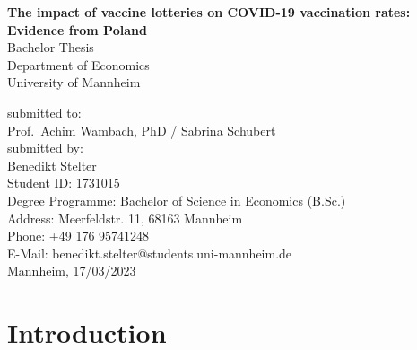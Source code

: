 \documentclass{scrbook}
\begin{document}
	
\frontmatter
\begin{titlepage}

\begin{center}

\vspace*{1,2cm}

\huge {\bfseries The impact of vaccine lotteries on COVID-19 vaccination
rates: Evidence from Poland}\\[1.8cm]

\Large {Bachelor Thesis}\\[1cm]

\large {Department of Economics}\\[0.2cm]

\large {University of Mannheim}\\[0.5cm]

\end{center}

\vfill

\noindent submitted to:\\
Prof.~Achim Wambach, PhD / Sabrina Schubert\\[1cm]
submitted by:\\
Benedikt Stelter\\[1cm]
Student ID: 1731015\\
Degree Programme: Bachelor of Science in Economics (B.Sc.)\\[1cm]
Address: Meerfeldstr. 11, 68163 Mannheim\\
Phone: +49 176 95741248\\
E-Mail: benedikt.stelter@students.uni-mannheim.de\\[1cm]
Mannheim, 17/03/2023

\setcounter{page}{0}

\end{titlepage}

  \tableofcontents


\listoffigures

\listoftables


\mainmatter

\chapter{Introduction}
\end{document}
